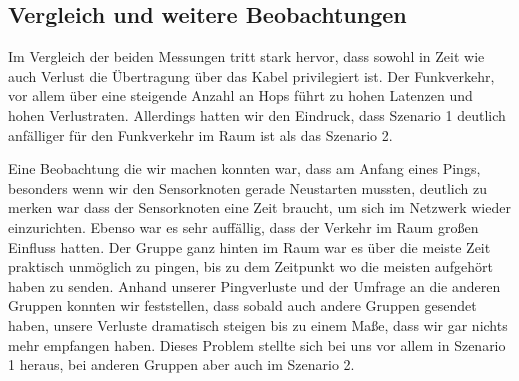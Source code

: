 \documentclass[]{scrartcl}
\begin{document}
\subsection{Vergleich und weitere Beobachtungen}

Im Vergleich der beiden Messungen tritt stark hervor, dass sowohl in Zeit wie auch Verlust die Übertragung über das Kabel privilegiert ist. Der Funkverkehr, vor allem über eine steigende Anzahl an Hops führt zu hohen Latenzen und hohen Verlustraten. Allerdings hatten wir den Eindruck, dass Szenario 1 deutlich anfälliger für den Funkverkehr im Raum ist als das Szenario 2.

Eine Beobachtung die wir machen konnten war, dass am Anfang eines Pings, besonders wenn wir den Sensorknoten gerade Neustarten mussten, deutlich zu merken war dass der Sensorknoten eine Zeit braucht, um sich im Netzwerk wieder einzurichten. Ebenso war es sehr auffällig, dass der Verkehr im Raum großen Einfluss hatten. Der Gruppe ganz hinten im Raum war es über die meiste Zeit praktisch unmöglich zu pingen, bis zu dem Zeitpunkt wo die meisten aufgehört haben zu senden. Anhand unserer Pingverluste und der Umfrage an die anderen Gruppen konnten wir feststellen, dass sobald auch andere Gruppen gesendet haben, unsere Verluste dramatisch steigen bis zu einem Maße, dass wir gar nichts mehr empfangen haben. Dieses Problem stellte sich bei uns vor allem in Szenario 1 heraus, bei anderen Gruppen aber auch im Szenario 2.
\end{document}
